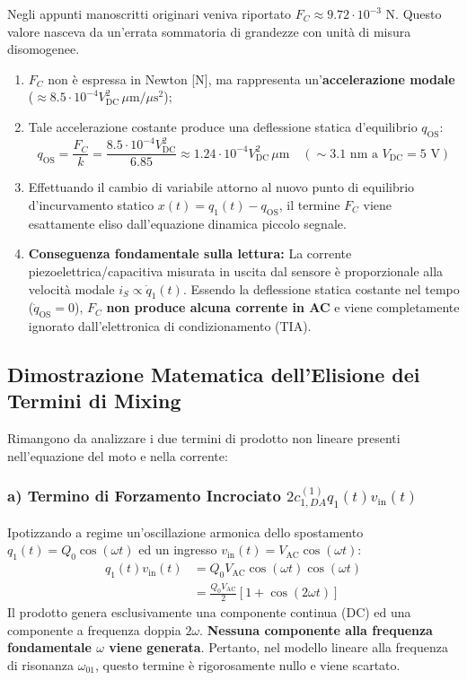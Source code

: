 \documentclass[11pt,a4paper]{article}
\begin{document}
\begin{corrbox}
Negli appunti manoscritti originari veniva riportato $F_C \approx 9.72 \cdot 10^{-3}\text{ N}$. Questo valore nasceva da un'errata sommatoria di grandezze con unità di misura disomogenee.
\begin{enumerate}
    \item $F_C$ non è espressa in Newton [N], ma rappresenta un'\textbf{accelerazione modale} ($\approx 8.5 \cdot 10^{-4} V_{\text{DC}}^2\,\mu\text{m}/\mu\text{s}^2$);
    \item Tale accelerazione costante produce una deflessione statica d'equilibrio $q_{\text{OS}}$:
    \begin{equation}
        q_{\text{OS}} = \frac{F_C}{k} = \frac{8.5 \cdot 10^{-4} V_{\text{DC}}^2}{6.85} \approx 1.24 \cdot 10^{-4} V_{\text{DC}}^2 \,\mu\text{m} \quad (\sim 3.1\text{ nm a } V_{\text{DC}} = 5\text{ V})
    \end{equation}
    \item Effettuando il cambio di variabile attorno al nuovo punto di equilibrio d'incurvamento statico $x(t) = q_1(t) - q_{\text{OS}}$, il termine $F_C$ viene esattamente eliso dall'equazione dinamica piccolo segnale.
    \item \textbf{Conseguenza fondamentale sulla lettura:} La corrente piezoelettrica/capacitiva misurata in uscita dal sensore è proporzionale alla velocità modale $i_S \propto \dot{q}_1(t)$. Essendo la deflessione statica costante nel tempo ($\dot{q}_{\text{OS}} = 0$), $F_C$ \textbf{non produce alcuna corrente in AC} e viene completamente ignorato dall'elettronica di condizionamento (TIA).
\end{enumerate}
\end{corrbox}

\subsection{Dimostrazione Matematica dell'Elisione dei Termini di Mixing}
Rimangono da analizzare i due termini di prodotto non lineare presenti nell'equazione del moto e nella corrente:

\subsubsection{a) Termino di Forzamento Incrociato \texorpdfstring{$2 c_{1,DA}^{(1)} q_1(t) v_{\text{in}}(t)$}{2 c1DA q1 vin}}
Ipotizzando a regime un'oscillazione armonica dello spostamento $q_1(t) = Q_0 \cos(\omega t)$ ed un ingresso $v_{\text{in}}(t) = V_{\text{AC}} \cos(\omega t)$:
\begin{align}
    q_1(t) v_{\text{in}}(t) &= Q_0 V_{\text{AC}} \cos(\omega t) \cos(\omega t) \nonumber \\
    &= \frac{Q_0 V_{\text{AC}}}{2} \left[ 1 + \cos(2\omega t) \right]
\end{align}
Il prodotto genera esclusivamente una componente continua (DC) ed una componente a frequenza doppia $2\omega$. \textbf{Nessuna componente alla frequenza fondamentale $\omega$ viene generata}. Pertanto, nel modello lineare alla frequenza di risonanza $\omega_{01}$, questo termine è rigorosamente nullo e viene scartato.
\end{document}
